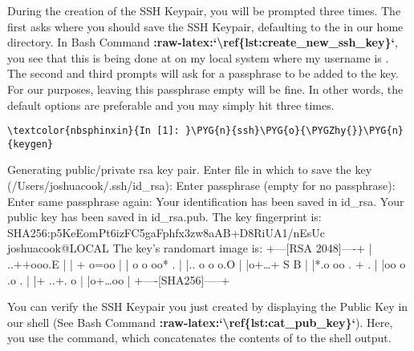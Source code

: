 \documentclass[letterpaper,10pt,english]{sphinxmanual}
\begin{document}
During the creation of the SSH Keypair, you will be prompted three
times. The first asks where you should save the SSH Keypair, defaulting
to the  in our home directory. In Bash Command
{\color{red}\bfseries{}:raw-latex:{}`\textbackslash{}ref\{lst:create\_new\_ssh\_key\}{}`}, you see that this is being
done at  on my local system where my
username is . The second and third prompts will ask for a
passphrase to be added to the key. For our purposes, leaving this
passphrase empty will be fine. In other words, the default options are
preferable and you may simply hit  three times.

%
\begin{Verbatim}[commandchars=\\\{\}]
\textcolor{nbsphinxin}{In [1]: }\PYG{n}{ssh}\PYG{o}{\PYGZhy{}}\PYG{n}{keygen}
\end{Verbatim}



%
\begin{OriginalVerbatim}[commandchars=\\\{\}]
Generating public/private rsa key pair.
Enter file in which to save the key (/Users/joshuacook/.ssh/id\_rsa):
Enter passphrase (empty for no passphrase):
Enter same passphrase again:
Your identification has been saved in id\_rsa.
Your public key has been saved in id\_rsa.pub.
The key fingerprint is:
SHA256:p5KeEomPt6izFC5gaFphfx3zw8aAB+D8RiUA1/nEsUc joshuacook@LOCAL
The key's randomart image is:
+---[RSA 2048]----+
|  ..++ooo.E      |
|   +  o=oo       |
|  o o oo* .      |
|.. o o o.O       |
|o+{\ldots}+ S B      |
|*.o oo . + .     |
|oo o .o .        |
|+ ..+. o         |
|o+{\ldots}oo          |
+----[SHA256]-----+
\end{OriginalVerbatim}
\relax

You can verify the SSH Keypair you just created by displaying the Public
Key in our shell (See Bash Command {\color{red}\bfseries{}:raw-latex:{}`\textbackslash{}ref\{lst:cat\_pub\_key\}{}`}).
Here, you use the  command, which concatenates the contents of
 to the shell output.
\end{document}
